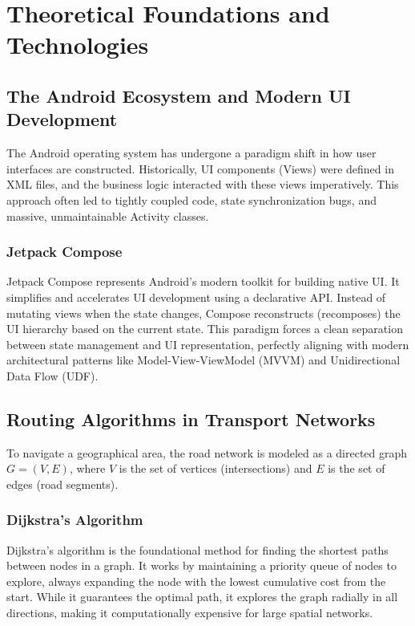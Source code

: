\documentclass[12pt,a4paper,oneside]{report}
\begin{document}
\chapter{Theoretical Foundations and Technologies}

\section{The Android Ecosystem and Modern UI Development}
The Android operating system has undergone a paradigm shift in how user interfaces are constructed. Historically, UI components (Views) were defined in XML files, and the business logic interacted with these views imperatively. This approach often led to tightly coupled code, state synchronization bugs, and massive, unmaintainable Activity classes.

\subsection{Jetpack Compose}
Jetpack Compose represents Android's modern toolkit for building native UI. It simplifies and accelerates UI development using a declarative API. Instead of mutating views when the state changes, Compose reconstructs (recomposes) the UI hierarchy based on the current state. This paradigm forces a clean separation between state management and UI representation, perfectly aligning with modern architectural patterns like Model-View-ViewModel (MVVM) and Unidirectional Data Flow (UDF).

\section{Routing Algorithms in Transport Networks}
To navigate a geographical area, the road network is modeled as a directed graph $G = (V, E)$, where $V$ is the set of vertices (intersections) and $E$ is the set of edges (road segments).

\subsection{Dijkstra's Algorithm}
Dijkstra's algorithm is the foundational method for finding the shortest paths between nodes in a graph. It works by maintaining a priority queue of nodes to explore, always expanding the node with the lowest cumulative cost from the start. While it guarantees the optimal path, it explores the graph radially in all directions, making it computationally expensive for large spatial networks.
\end{document}
